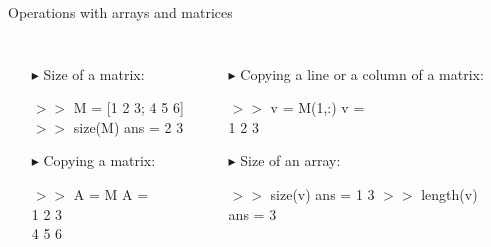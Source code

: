 \documentclass[xcolor={dvipsnames,rgb}, aspectratio=169]{beamer}
\begin{document}
\begin{frame}{Operations with arrays and matrices}
\begin{columns}
\begin{itemize}
   \vspace{-10pt}
   \item[$\blacktriangleright$] Size of a matrix:
   \begin{tcolorbox}[colback=white,colframe=bluepoli]
      $>>$ M = [1 2 3; 4 5 6] \\
      $>>$ size(M)
      \tcblower
      ans = 2 3
   \end{tcolorbox}

   \vspace{-5pt}
   \item[$\blacktriangleright$] Copying a matrix:
   \begin{tcolorbox}[colback=white,colframe=bluepoli]
      $>>$ A = M 
      \tcblower
      A = \\
      \hspace{3em} 1 \hspace{3em} 2 \hspace{3em} 3 \\
      \hspace{3em} 4 \hspace{3em} 5 \hspace{3em} 6
   \end{tcolorbox}
\end{itemize}
\begin{itemize}
   \vspace{-10pt}
   \item[$\blacktriangleright$] Copying a line or a column of a matrix:
   \begin{tcolorbox}[colback=white,colframe=bluepoli]
      $>>$ v = M(1,:) 
      \tcblower
      v = \\
      \hspace{3em} 1 \hspace{3em} 2 \hspace{3em} 3
   \end{tcolorbox}

   \item[$\blacktriangleright$] Size of an array:
   \begin{tcolorbox}[colback=white,colframe=bluepoli]
      $>>$ size(v)
      ans = 1 3
      \tcblower
      $>>$ length(v)\\
      ans = 3
   \end{tcolorbox}
\end{itemize}
\end{columns}
\end{frame}
\end{document}
